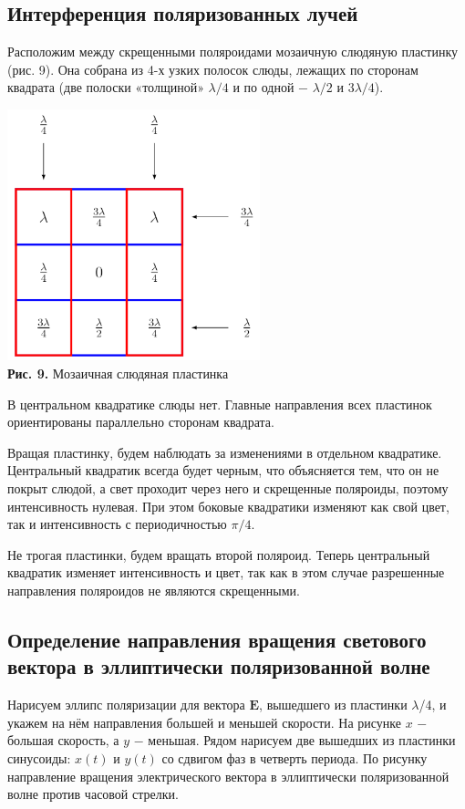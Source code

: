 \documentclass[a4paper,12pt]{article} %
\begin{document}
\subsection{Интерференция поляризованных лучей}

\hfill \break Расположим между скрещенными поляроидами мозаичную слюдяную пластинку (рис. 9). Она собрана из 4-х узких полосок слюды, лежащих по сторонам квадрата (две полоски «толщиной» $\lambda/4$ и по одной $-$ $\lambda/2$ и $3\lambda/4$).

\begin{center}
\includegraphics[width=0.55\textwidth]{4.7.3_11.png}\\
\textbf{Рис. 9.} Мозаичная слюдяная пластинка \\
\end{center}

\hfill \break В центральном квадратике слюды нет. Главные направления всех пластинок ориентированы параллельно сторонам квадрата. 

\hfill \break Вращая пластинку, будем наблюдать за изменениями в отдельном квадратике. Центральный квадратик всегда будет черным, что объясняется тем, что он не покрыт слюдой, а свет проходит через него и скрещенные поляроиды, поэтому интенсивность нулевая. При этом боковые квадратики изменяют как свой цвет, так и интенсивность с периодичностью $\pi/4$.

\hfill \break Не трогая пластинки, будем вращать второй поляроид. Теперь центральный квадратик изменяет интенсивность и цвет, так как в этом случае разрешенные направления поляроидов не являются скрещенными.

\subsection{Определение направления вращения светового вектора в эллиптически поляризованной волне}
\hfill \break Нарисуем эллипс поляризации для вектора $\boldsymbol{E}$, вышедшего из пластинки $\lambda$/4, и укажем на нём направления большей и меньшей скорости. На рисунке $x$ $-$ большая скорость, а $y$ $-$ меньшая. Рядом нарисуем две вышедших из пластинки синусоиды: $x(t)$ и $y(t)$ со сдвигом фаз в четверть периода. По рисунку направление вращения электрического вектора в эллиптически поляризованной волне против часовой стрелки.
\end{document}
